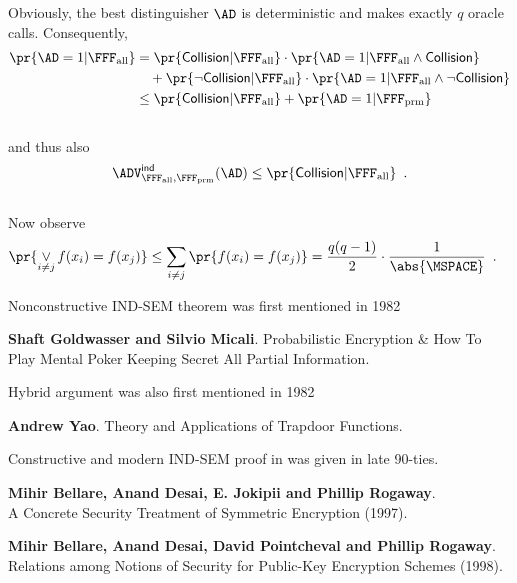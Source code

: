 \documentclass[landscape,footrule]{foils}
\newcommand{\lastline}{\vspace*{-2ex}}
\begin{document}
\enlargethispage{2cm}

Obviously, the best distinguisher $\AD$ is deterministic and makes
exactly $q$ oracle calls. Consequently,\vspace*{-1.5ex}
\begin{align*}
  \pr{\AD=1|\FFFALL}%
  &=\pr{\mathsf{Collision}|\FFFALL}\cdot\pr{\AD=1|\FFFALL\wedge\mathsf{Collision}}\\
  &\quad+\pr{\neg\mathsf{Collision}|\FFFALL}\cdot\pr{\AD=1|\FFFALL\wedge\neg\mathsf{Collision}}\\
  &\leq \pr{\mathsf{Collision}|\FFFALL} +\pr{\AD=1|\FFFPERM}\enspace
\end{align*}
\vspace*{-4.5ex}\\
and thus also\vspace*{-1.5ex}
\begin{align*}
    \advIndXX{\FFFALL,\FFFPERM}{\AD}\leq\pr{\mathsf{Collision}|\FFFALL}\enspace.
\end{align*}
\vspace*{-4.5ex}\\
Now observe
  \begin{align*}
    \pr{\Vee\limits_{i\neq j} f(x_i)=f(x_j)}%
    &\leq \sum_{i\neq j}
    \pr{f(x_i)=f(x_j)}=\frac{q(q-1)}{2}\cdot \frac{1}{\abs{\MSPACE}}\enspace.
  \end{align*}


Nonconstructive IND-SEM theorem was first mentioned in 1982 
\begin{triangles}
  \item \textbf{Shaft Goldwasser and Silvio Micali}. Probabilistic Encryption \&
  How To Play Mental Poker Keeping Secret All Partial Information.
\end{triangles}
\bigskip

Hybrid argument was also first mentioned in 1982
\begin{triangles}
  \item \textbf{Andrew Yao}. Theory and Applications of Trapdoor Functions. 
\end{triangles}
\bigskip

Constructive and modern IND-SEM proof in was given in late 90-ties.
\begin{triangles}
\item \textbf{Mihir Bellare, Anand Desai, E. Jokipii and Phillip Rogaway}.\\ A
    Concrete Security Treatment of Symmetric Encryption (1997).
\item \textbf{Mihir Bellare, Anand Desai, David Pointcheval and Phillip
  Rogaway}. Relations among Notions of Security for Public-Key
    Encryption Schemes (1998).\lastline
\end{triangles}
\end{document}
